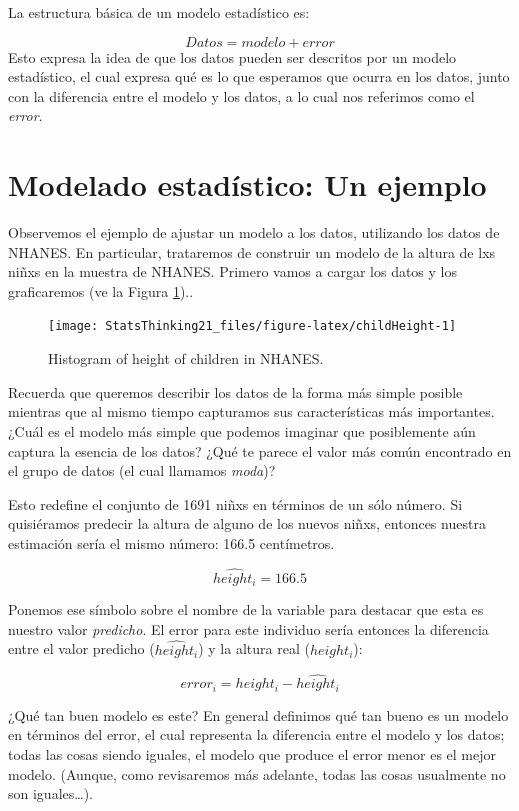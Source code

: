 \documentclass[
  12pt,
]{book}
\theoremstyle{definition}
\theoremstyle{definition}
\theoremstyle{definition}
\theoremstyle{remark}
\begin{document}
La estructura básica de un modelo estadístico es:

\[
Datos= modelo + error
\]
Esto expresa la idea de que los datos pueden ser descritos por un modelo estadístico, el cual expresa qué es lo que esperamos que ocurra en los datos, junto con la diferencia entre el modelo y los datos, a lo cual nos referimos como el \emph{error}.

\hypertarget{modelado-estaduxedstico-un-ejemplo}{%
\section{Modelado estadístico: Un ejemplo}\label{modelado-estaduxedstico-un-ejemplo}}

Observemos el ejemplo de ajustar un modelo a los datos, utilizando los datos de NHANES. En particular, trataremos de construir un modelo de la altura de lxs niñxs en la muestra de NHANES. Primero vamos a cargar los datos y los graficaremos (ve la Figura \ref{fig:childHeight})..

\begin{figure}
\texttt{[image: StatsThinking21\_files/figure-latex/childHeight-1]} \caption{Histogram of height of children in NHANES.}\label{fig:childHeight}
\end{figure}

Recuerda que queremos describir los datos de la forma más simple posible mientras que al mismo tiempo capturamos sus características más importantes. ¿Cuál es el modelo más simple que podemos imaginar que posiblemente aún captura la esencia de los datos? ¿Qué te parece el valor más común encontrado en el grupo de datos (el cual llamamos \emph{moda})?

Esto redefine el conjunto de 1691 niñxs en términos de un sólo número. Si quisiéramos predecir la altura de alguno de los nuevos niñxs, entonces nuestra estimación sería el mismo número: 166.5 centímetros.

\[
\hat{height_i} = 166.5
\]

Ponemos ese símbolo sobre el nombre de la variable para destacar que esta es nuestro valor \emph{predicho}. El error para este individuo sería entonces la diferencia entre el valor predicho (\(\hat{height_i}\)) y la altura real (\(height_i\)):

\[
error_i = height_i - \hat{height_i}
\]

¿Qué tan buen modelo es este? En general definimos qué tan bueno es un modelo en términos del error, el cual representa la diferencia entre el modelo y los datos; todas las cosas siendo iguales, el modelo que produce el error menor es el mejor modelo. (Aunque, como revisaremos más adelante, todas las cosas usualmente no son iguales\ldots).
\end{document}
